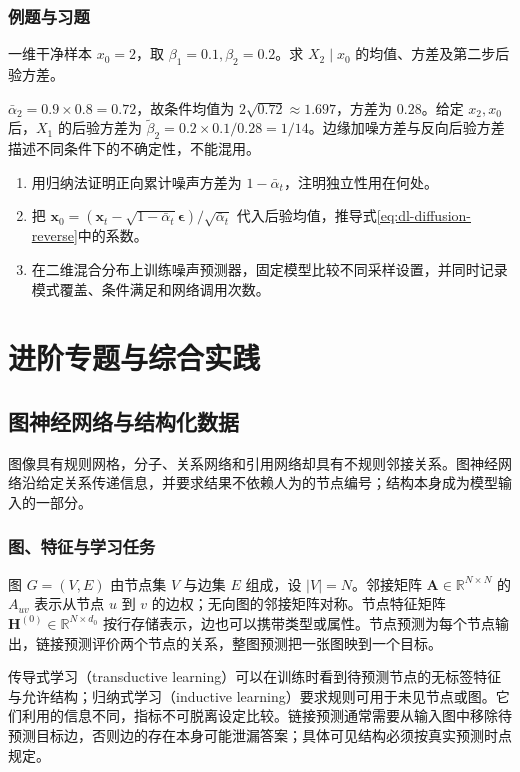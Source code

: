 \documentclass[UTF8,12pt,a4paper,fontset=fandol]{ctexbook}
\begin{document}
\section{例题与习题}
\begin{example}[两步加噪]
一维干净样本 $x_0=2$，取 $\beta_1=0.1,\beta_2=0.2$。求 $X_2\mid x_0$ 的均值、方差及第二步后验方差。
\end{example}
\begin{solve}
$\bar\alpha_2=0.9\times0.8=0.72$，故条件均值为 $2\sqrt{0.72}\approx1.697$，方差为 $0.28$。给定 $x_2,x_0$ 后，$X_1$ 的后验方差为 $\widetilde\beta_2=0.2\times0.1/0.28=1/14$。边缘加噪方差与反向后验方差描述不同条件下的不确定性，不能混用。
\end{solve}
\begin{enumerate}
\item 用归纳法证明正向累计噪声方差为 $1-\bar\alpha_t$，注明独立性用在何处。
\item 把 $\mathbf x_0=(\mathbf x_t-\sqrt{1-\bar\alpha_t}\boldsymbol\epsilon)/\sqrt{\bar\alpha_t}$ 代入后验均值，推导式\eqref{eq:dl-diffusion-reverse}中的系数。
\item 在二维混合分布上训练噪声预测器，固定模型比较不同采样设置，并同时记录模式覆盖、条件满足和网络调用次数。
\end{enumerate}

\part{进阶专题与综合实践}

\chapter{图神经网络与结构化数据}
\label{chap:dl-gnn}
图像具有规则网格，分子、关系网络和引用网络却具有不规则邻接关系。图神经网络沿给定关系传递信息，并要求结果不依赖人为的节点编号；结构本身成为模型输入的一部分。

\section{图、特征与学习任务}
图 $G=(V,E)$ 由节点集 $V$ 与边集 $E$ 组成，设 $|V|=N$。邻接矩阵 $\mathbf A\in\mathbb R^{N\times N}$ 的 $A_{uv}$ 表示从节点 $u$ 到 $v$ 的边权；无向图的邻接矩阵对称。节点特征矩阵 $\mathbf H^{(0)}\in\mathbb R^{N\times d_0}$ 按行存储表示，边也可以携带类型或属性。节点预测为每个节点输出，链接预测评价两个节点的关系，整图预测把一张图映到一个目标。

传导式学习（transductive learning）可以在训练时看到待预测节点的无标签特征与允许结构；归纳式学习（inductive learning）要求规则可用于未见节点或图。它们利用的信息不同，指标不可脱离设定比较。链接预测通常需要从输入图中移除待预测目标边，否则边的存在本身可能泄漏答案；具体可见结构必须按真实预测时点规定。
\end{document}
